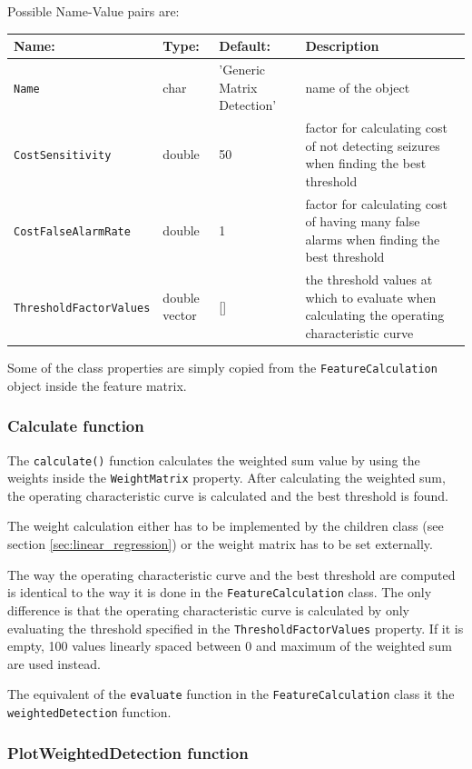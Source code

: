 \documentclass[usletter, 11pt]{extarticle}
\begin{document}
Possible Name-Value pairs are:
\begin{center}
	\begin{longtable}{p{4.5cm}|p{1.5cm}|p{3.5cm}|p{6.5cm}}
	\textbf{Name:} & \textbf{Type:} & \textbf{Default:} & \textbf{Description} \\ \hline
	\texttt{Name} & char & 'Generic Matrix Detection' & name of the object\\
	\texttt{CostSensitivity} & double & 50 & factor for calculating cost of not detecting seizures when finding the best threshold \\
	\texttt{CostFalseAlarmRate} & double & 1 & factor for calculating cost of having many false alarms when finding the best threshold \\
	\texttt{ThresholdFactorValues} & double vector & [] & the threshold values at which to evaluate when calculating the operating characteristic curve
\end{longtable}
\end{center}

Some of the class properties are simply copied from the \verb|FeatureCalculation| object inside the feature matrix.

\subsubsection{Calculate function}

The \verb|calculate()| function calculates the weighted sum value by using the weights inside the \verb|WeightMatrix| property. After calculating the weighted sum, the operating characteristic curve is calculated and the best threshold is found. 

The weight calculation either has to be implemented by the children class (see section \ref{sec:linear_regression}) or the weight matrix has to be set externally.

The way the operating characteristic curve and the best threshold are computed is identical to the way it is done in the \verb|FeatureCalculation| class. The only difference is that the operating characteristic curve is calculated by only evaluating the threshold specified in the \verb|ThresholdFactorValues| property. If it is empty, 100 values linearly spaced between 0 and maximum of the weighted sum are used instead.

The equivalent of the \verb|evaluate| function in the \verb|FeatureCalculation| class it the \verb|weightedDetection| function.


\subsubsection{PlotWeightedDetection function}
\end{document}
